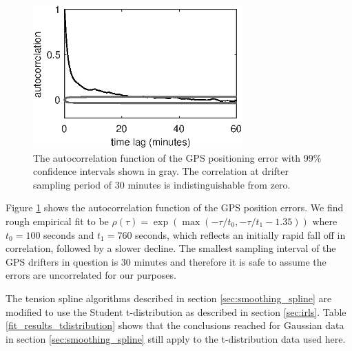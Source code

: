 \documentclass[10pt,journal]{IEEEtran}
\begin{document}
\begin{figure}
  \centerline{\includegraphics[width=19pc,angle=0]{figures/gps_autocorrelation}}
  \caption{The autocorrelation function of the GPS positioning error with 99\% confidence intervals shown in gray. The correlation at drifter sampling period of 30 minutes is indistinguishable from zero.}
  \label{gps_autocorrelation}
\end{figure}

Figure \ref{gps_autocorrelation} shows the autocorrelation function of the GPS position errors. We find rough empirical fit to be $\rho(\tau)=\exp\left(\max(-\tau/t_0,-\tau/t_1-1.35)\right)$ where $t_0=100$ seconds and $t_1=760$ seconds, which reflects an initially rapid fall off in correlation, followed by a slower decline. The smallest sampling interval of the GPS drifters in question is 30 minutes and therefore it is safe to assume the errors are uncorrelated for our purposes.

The tension spline algorithms described in section \ref{sec:smoothing_spline} are modified to use the Student t-distribution as described in section \ref{sec:irls}. Table \ref{fit_results_tdistribution} shows that the conclusions reached for Gaussian data in section \ref{sec:smoothing_spline} still apply to the t-distribution data used here.
\end{document}
